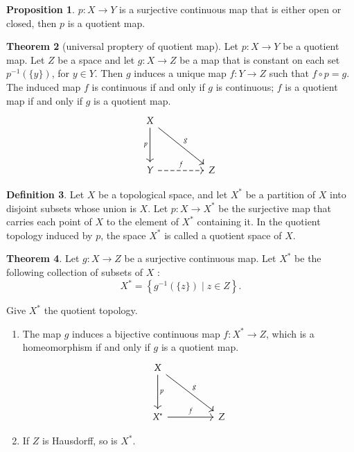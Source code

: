 \documentclass[12pt,a4paper]{book}
\newenvironment{enu}{\begin{enumerate}[(1)]}{\end{enumerate}}
\theoremstyle{definition}
\newtheorem{defn}{Definition}[section]
\newtheorem{theo}[defn]{Theorem}
\newtheorem{prop}[defn]{Proposition}
\begin{document}
\begin{prop}
    $p:X\rightarrow Y$ is a surjective continuous map that is either open or closed, then $p$ is a quotient map.
\end{prop}
\begin{theo}[universal proptery of quotient map]
    Let $p: X \rightarrow Y$ be a quotient map.
    Let $Z$ be a space and let $g: X \rightarrow Z$
    be a map that is constant on each set $p^{-1}(\{y\})$,
    for $y \in Y$. Then $g$ induces a unique map $f: Y \rightarrow Z$ such that $f \circ p=g$. The induced map $f$ is continuous if and only if $g$ is continuous; $f$ is a quotient map if and only if $g$ is a quotient map.
    \[\begin{tikzcd}
            X \\
            \\
            Y && Z
            \arrow["f", dashed, from=3-1, to=3-3]
            \arrow["g", from=1-1, to=3-3]
            \arrow["p"', from=1-1, to=3-1]
        \end{tikzcd}\]
    \label{proposition:universal proptery of quotient map}
\end{theo}
\begin{defn}
    Let $X$ be a topological space, and let $X^*$ be a partition of $X$ into disjoint subsets whose union is $X$. Let $p: X \rightarrow X^*$ be the surjective map that carries each point of $X$ to the element of $X^*$ containing it. In the quotient topology induced by $p$, the space $X^*$ is called a quotient space of $X$.
\end{defn}
\begin{theo}
    Let $g: X \rightarrow Z$ be a surjective continuous map. Let $X^*$ be the following collection of subsets of $X$ :
    $$
        X^*=\left\{g^{-1}(\{z\}) \mid z \in Z\right\} .
    $$

    Give $X^*$ the quotient topology.
    \begin{enu}
        \item  The map $g$ induces a bijective continuous map $f: X^* \rightarrow Z$, which is a homeomorphism if and only if $g$ is a quotient map.
        \[\begin{tikzcd}
                X \\
                \\
                {X^*} && Z
                \arrow["p", from=1-1, to=3-1]
                \arrow["g", from=1-1, to=3-3]
                \arrow["f", from=3-1, to=3-3]
            \end{tikzcd}\]
        \item  If $Z$ is Hausdorff, so is $X^*$.
    \end{enu}

\end{theo}
\end{document}
